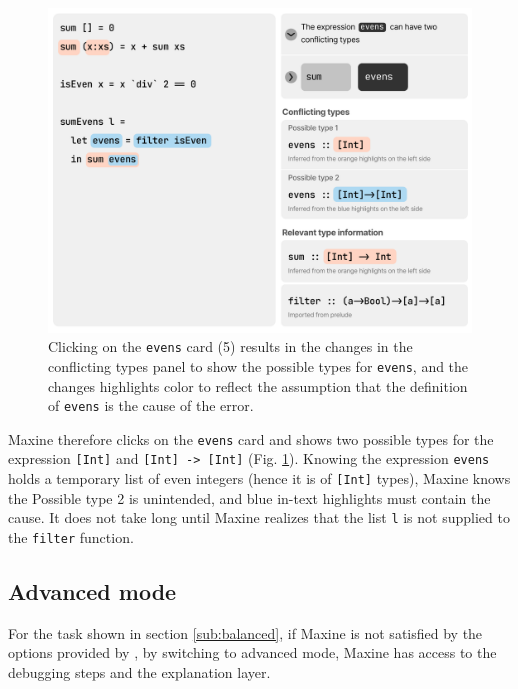 \begin{figure}
   \centering
        \includegraphics[width=\linewidth]{images/balanced-mode-2.pdf}
        \caption{
            Clicking on the \texttt{evens} card (5) results in the changes in the
            conflicting types panel to show the possible types for \texttt{evens},
            and the changes highlights color to reflect the assumption that the
            definition of \texttt{evens} is the cause of the error.  
        }
        \label{fig:balance-mode-2}
\end{figure}



Maxine therefore clicks on the \texttt{evens} card and \chameleon{} shows two
possible types for the expression \texttt{[Int]} and \texttt{[Int] -> [Int]}
(Fig. \ref{fig:balance-mode-2}). Knowing the expression \texttt{evens} holds
a temporary list of even integers (hence it is of \texttt{[Int]} types), Maxine
knows the Possible type 2 is unintended, and blue in-text highlights must
contain the cause. It does not take long until Maxine realizes that the list 
\texttt{l} is not supplied to the \texttt{filter} function.


\subsection{Advanced mode}  \label{sub:advanced}


For the task shown in section \ref{sub:balanced}, if Maxine is not satisfied by
the options provided by \chameleon{}, by switching to advanced
mode, Maxine has access to the debugging steps and the explanation layer. 

